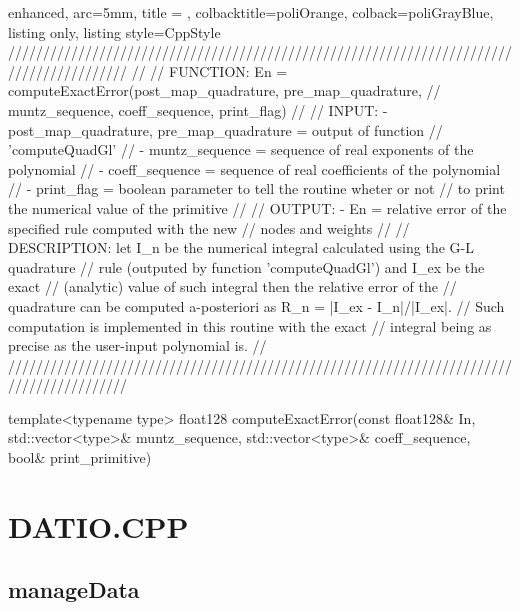 \documentclass[a4paper, twosided]{book}
\begin{document}
\begin{tcblisting}{enhanced,
                   arc=5mm,
                   title = \color{black}{\large \ttfamily MonMap.cpp/computeExactError},
                   colbacktitle=poliOrange,
                   colback=poliGrayBlue,
                   listing only,
                   listing style=CppStyle}
/////////////////////////////////////////////////////////////////////////////////////////
//
//       FUNCTION: En = computeExactError({post_map_quadrature, pre_map_quadrature}, 
//                                       muntz_sequence, coeff_sequence, print_flag)
//                
//          INPUT: - {post_map_quadrature, pre_map_quadrature} = output of function
//                                                               'computeQuadGl'
//                 - muntz_sequence = sequence of real exponents of the polynomial
//                 - coeff_sequence = sequence of real coefficients of the polynomial
//                 - print_flag = boolean parameter to tell the routine wheter or not
//                                to print the numerical value of the primitive
//
//         OUTPUT: - En = relative error of the specified rule computed with the new
//                        nodes and weights
//
//    DESCRIPTION: let I_n be the numerical integral calculated using the G-L quadrature
//                 rule (outputed by function 'computeQuadGl') and I_ex be the exact
//                 (analytic) value of such integral then the relative error of the 
//                 quadrature can be computed a-posteriori as R_n = |I_ex - I_n|/|I_ex|.
//                 Such computation is implemented in this routine with the exact 
//                 integral being as precise as the user-input polynomial is.
//
/////////////////////////////////////////////////////////////////////////////////////////

template<typename type>
float128 computeExactError(const float128& In, std::vector<type>& muntz_sequence, std::vector<type>& coeff_sequence, bool& print_primitive)
\end{tcblisting}

\newpage
\section[DatIo.cpp]{\changefont DATIO.CPP}\label{Sec4.2}

\subsection[manageData]{\changefont manageData}\label{SubSec4.2.1}
\end{document}
